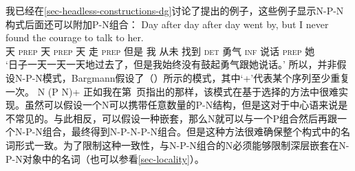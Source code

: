 \begin{exe}
\begin{xlist}[iv.]
\begin{exe}
\begin{xlist}[iv.]
我已经在\ref{sec-headless-constructions-dg}讨论了\citet{Bargmann2015a}提出的例子，这些例子显示N-P-N构式后面还可以附加P-N组合：
\ea
\gll Day after day after day went by, but I never found the courage to talk to her.\\
     天 \textsc{prep} 天 \textsc{prep} 天 走 \textsc{prep} 但是 我 从未 找到 \textsc{det} 勇气 \textsc{inf} 说话 \textsc{prep} 她\\
\glt `日子一天一天一天地过去了，但是我始终没有鼓起勇气跟她说话。'
\z
所以，并非假设N-P-N模式，Bargmann假设了（）所示的模式，其中`+'\is{$+$}代表某个序列至少重复一次。
\ea
N (P N)+
\z
正如我在第~\pageref{n-p-n-plus-cx}页指出的那样，该模式在基于选择的方法中很难实现。虽然可以假设一个N可以携带任意数量的P-N结构，但是这对于中心语来说是不常见的。与此相反，可以假设一种嵌套，那么N就可以与一个P组合然后再跟一个N-P-N组合，最终得到N-P-N-P-N组合。但是这种方法很难确保整个构式中的名词形式一致。为了限制这种一致性，与N-P-N组合的N必须能够限制深层嵌套在N-P-N对象中的名词（也可以参看\ref{sec-locality}）。


\end{xlist}
\end{exe}
\end{xlist}
\end{exe}
